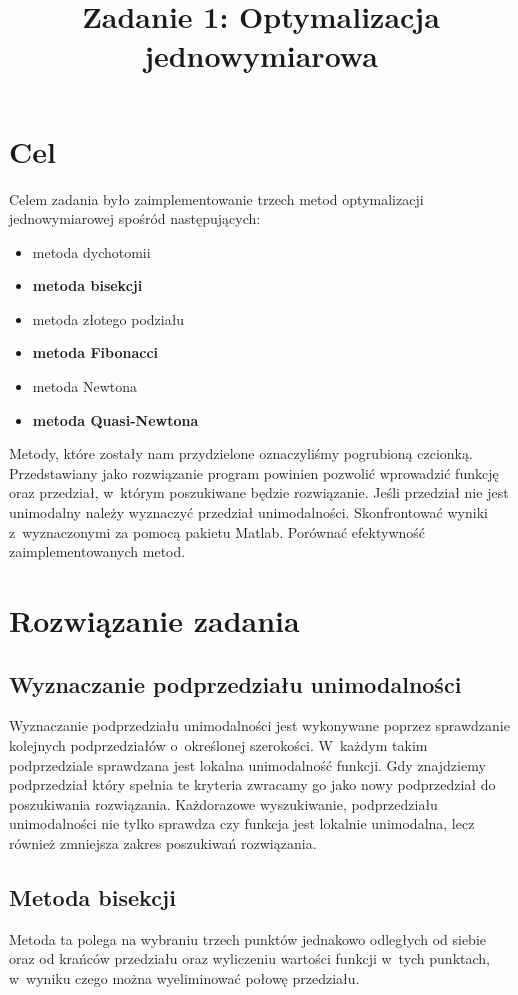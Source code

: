 \documentclass{classrep}
\author{
  \studentinfo{Paweł Musiał}{178726} \and
  \studentinfo{Łukasz Michalski}{178724}
}
\title{Zadanie 1: Optymalizacja jednowymiarowa} %
\begin{document}
\maketitle


\addtocounter{footnote}{1}

\section{Cel}
Celem zadania było zaimplementowanie trzech metod optymalizacji jednowymiarowej spośród następujących:
\begin{itemize}
	\item	metoda dychotomii
	\item	\textbf{metoda bisekcji}
	\item	metoda złotego podziału
	\item	\textbf{metoda Fibonacci}
	\item	metoda Newtona
	\item	\textbf{metoda Quasi-Newtona}
\end{itemize}
Metody, które zostały nam przydzielone oznaczyliśmy pogrubioną czcionką. Przedstawiany jako rozwiązanie program powinien pozwolić wprowadzić funkcję oraz przedział, w~którym poszukiwane będzie rozwiązanie. Jeśli przedział nie jest unimodalny należy wyznaczyć przedział unimodalności. Skonfrontować wyniki z~wyznaczonymi za pomocą pakietu Matlab. Porównać efektywność zaimplementowanych metod.

\section{Rozwiązanie zadania}
\subsection{Wyznaczanie podprzedziału unimodalności}
Wyznaczanie podprzedziału unimodalności jest wykonywane poprzez sprawdzanie kolejnych podprzedziałów o~określonej szerokości. W~każdym takim podprzedziale sprawdzana jest lokalna unimodalność funkcji. Gdy znajdziemy podprzedział który spełnia te kryteria zwracamy go jako nowy podprzedział do poszukiwania rozwiązania. Każdorazowe wyszukiwanie, podprzedziału unimodalności nie tylko sprawdza czy funkcja jest lokalnie unimodalna, lecz również zmniejsza zakres poszukiwań rozwiązania.

\subsection{Metoda bisekcji \cite{1}}
Metoda ta polega na wybraniu trzech punktów jednakowo odległych od siebie oraz od krańców przedziału oraz wyliczeniu wartości funkcji w~tych punktach, w~wyniku czego można wyeliminować połowę przedziału.
\end{document}

